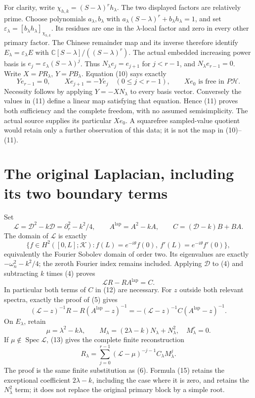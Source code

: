 \documentclass[11pt]{article}
\begin{document}
For clarity, write \(\chi_{h,k}=(S-\lambda)^r h_\lambda\).
The two displayed factors are relatively prime. Choose polynomials
\(a_\lambda,b_\lambda\) with
\(a_\lambda(S-\lambda)^r+b_\lambda h_\lambda=1\), and set
\(\varepsilon_\lambda=[b_\lambda h_\lambda]_{\chi_{h,k}}\).
Its residues are one in the \(\lambda\)-local factor and zero in
every other primary factor. The Chinese remainder map and its
inverse therefore identify \(E_\lambda=\varepsilon_\lambda E\)
with \(\mathbb C[S-\lambda]/((S-\lambda)^r)\).
The actual embedded increasing power basis is
\(e_j=\varepsilon_\lambda(S-\lambda)^j\). Thus
\(N_\lambda e_j=e_{j+1}\) for \(j<r-1\), and
\(N_\lambda e_{r-1}=0\). Write \(X=PR_\lambda\),
\(Y=PB_\lambda\). Equation (10) says exactly
\[
 Ye_{r-1}=0,\qquad
 Xe_{j+1}=-Ye_j\quad(0\le j<r-1),\qquad
 Xe_0\text{ is free in }P\mathscr H.
 \tag{11}
\]
Necessity follows by applying \(Y=-XN_\lambda\) to every basis
vector. Conversely the values in (11) define a linear map satisfying
that equation. Hence (11) proves both sufficiency and the complete
freedom, with no assumed semisimplicity. The actual source supplies
its particular \(Xe_0\). A squarefree sampled-value quotient would
retain only a further observation of this data; it is not the map
in (10)--(11).

\section{The original Laplacian, including its two boundary terms}
Set
\[
 \mathscr L=\mathscr D^2-k\mathscr D
 =\partial_r^2-k^2/4,
 \qquad A^{\mathrm{lap}}=A^2-kA,
 \qquad C=(\mathscr D-k)B+BA.
 \tag{12}
\]
The domain of \(\mathscr L\) is exactly
\[
 \{f\in H^2([0,L];\mathcal K):
 f(L)=e^{-i\theta}f(0),\ f'(L)=e^{-i\theta}f'(0)\},
\]
equivalently the Fourier Sobolev domain of order two.
Its eigenvalues are exactly \(-\omega_n^2-k^2/4\); the zeroth
Fourier index remains included. Applying \(\mathscr D\) to (4)
and subtracting \(k\) times (4) proves
\[
 \mathscr L R-RA^{\mathrm{lap}}=C.
 \tag{13}
\]
In particular both terms of \(C\) in (12) are necessary.
For \(z\) outside both relevant spectra, exactly the proof of (5)
gives
\[
 (\mathscr L-z)^{-1}R-R(A^{\mathrm{lap}}-z)^{-1}
 =-(\mathscr L-z)^{-1}C(A^{\mathrm{lap}}-z)^{-1}.
 \tag{14}
\]
On \(E_\lambda\), retain
\[
 \mu=\lambda^2-k\lambda,\qquad
 M_\lambda=(2\lambda-k)N_\lambda+N_\lambda^2,
 \quad M_\lambda^r=0.
 \tag{15}
\]
If \(\mu\notin\operatorname{Spec}\mathscr L\), (13) gives the
complete finite reconstruction
\[
 R_\lambda=\sum_{j=0}^{r-1}
       (\mathscr L-\mu)^{-j-1}C_\lambda M_\lambda^j.
 \tag{16}
\]
The proof is the same finite substitution as (6). Formula (15)
retains the exceptional coefficient \(2\lambda-k\), including
the case where it is zero, and retains the \(N_\lambda^2\) term;
it does not replace the original primary block by a simple root.
\end{document}
